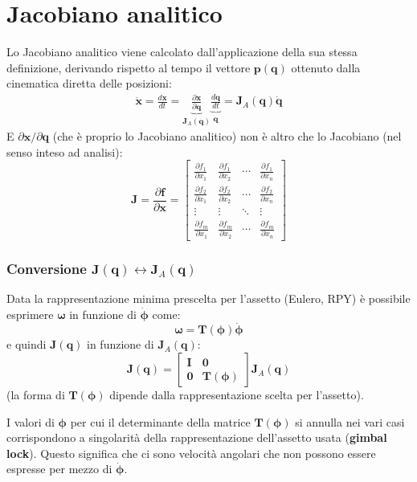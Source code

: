 \section{Jacobiano analitico}
Lo Jacobiano analitico viene calcolato dall’applicazione della sua stessa definizione, derivando rispetto al tempo il vettore $\bm{p}(\bm{q})$ ottenuto dalla cinematica diretta delle posizioni:	
\begin{gather*}
	\dot{\bm{x}}
	=
	\frac{d\bm{x}}{dt}
	=
	\underbrace{\frac{\partial\bm{x}}{\partial \bm{q}}}_{\bm{J}_A(\bm{q})}
	\underbrace{\frac{d\bm{q}}{d t}}_{\dot{\bm{q}}}
	=
	\bm{J}_A(\bm{q})\dot{\bm{q}}
\end{gather*}
E ${\partial\bm{x}} / {\partial \bm{q}}$ (che è proprio lo Jacobiano analitico) non è altro che lo Jacobiano (nel senso inteso ad analisi):
\[
\bm{J} = \frac{\partial \bm{f}}{\partial \bm{x}} =
\begin{bmatrix}
	\frac{\partial f_1}{\partial x_1} & \frac{\partial f_1}{\partial x_2} & \cdots & \frac{\partial f_1}{\partial x_n} \\[7pt]
	\frac{\partial f_2}{\partial x_1} & \frac{\partial f_2}{\partial x_2} & \cdots & \frac{\partial f_2}{\partial x_n} \\[5pt]
	\vdots & \vdots & \ddots & \vdots \\[5pt]
	\frac{\partial f_m}{\partial x_1} & \frac{\partial f_m}{\partial x_2} & \cdots & \frac{\partial f_m}{\partial x_n}
\end{bmatrix}
\]

\vspace*{10pt}
\subsubsection{Conversione $\bm{J}(\bm{q}) \leftrightarrow \bm{J}_A(\bm{q})$}
Data la rappresentazione minima prescelta per l’assetto (Eulero, RPY) è possibile esprimere $\bm{\omega}$ in funzione di $\dot{\bm{\phi}}$ come:
$$
\bm{\omega} = \bm{T}(\bm{\phi})\bm{\dot{\phi}}
$$
e quindi $\bm{J}(\bm{q})$ in funzione di $\bm{J}_A(\bm{q})$:
$$
\bm{J}(\bm{q})
=
\begin{bmatrix*}
\bm{I} & \bm{0} \\
\bm{0} & \bm{T}(\bm{\phi})
\end{bmatrix*}
\bm{J}_A(\bm{q})
$$
(la forma di $\bm{T}(\bm{\phi})$ dipende dalla rappresentazione scelta per l'assetto).

I valori di $\bm{\phi}$ per cui il determinante della matrice $\bm{T}(\bm{\phi})$ si annulla nei vari casi corrispondono a singolarità della rappresentazione dell’assetto usata (\textbf{gimbal lock}). Questo significa che ci sono velocità angolari che non possono essere espresse per mezzo di $\dot{\bm{\phi}}$.


